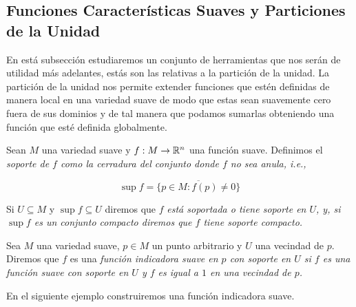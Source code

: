 \subsection{Funciones Características Suaves y Particiones de la Unidad} \label{Subsección: Funciones Características Suaves y Particiones De La Unidad}
En está subsección estudiaremos un conjunto de herramientas que nos serán de utilidad más adelantes, estás son las relativas a la partición de la unidad. La partición de la unidad nos permite extender funciones que estén definidas de manera local en una variedad suave de modo que estas sean suavemente cero fuera de sus dominios y de tal manera que podamos sumarlas obteniendo una función que esté definida globalmente.

\begin{definition}\label{Definición: Soporte de una Función}
	Sean $M$ una variedad suave y $f: M \to \mathbb{R}^n$ una función suave. Definimos el \it{soporte de} $f$ como la cerradura del conjunto donde $f$ no sea anula, i.e.,

	\[ \sup f = \overline{ \{ p \in M : f(p) \neq 0 \}} \]

	Si $U \subseteq M$ y $\sup f \subseteq U$ diremos que $f$ \it{está soportada} o \it{tiene soporte en} $U$, y, si $\sup f$ es un conjunto compacto diremos que $f$ tiene \it{soporte compacto}.
\end{definition}

\begin{definition}\label{Definición: Función Indicadora Suave}
	Sea $M$ una variedad suave, $p \in M$ un punto arbitrario y $U$ una vecindad de $p$. Diremos que $f$ es una \it{función indicadora suave en $p$ con soporte en} $U$ si $f$ es una función suave con soporte en $U$ y $f$ es igual a $1$ en una vecindad de $p$.
\end{definition}


En el siguiente ejemplo construiremos una función indicadora suave.

